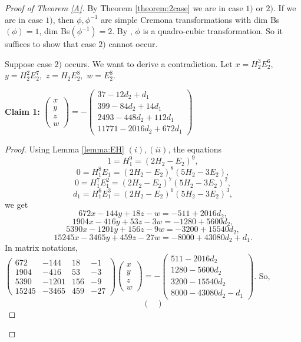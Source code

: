 \documentclass{article}
\begin{document}
\begin{proof}[Proof of Theorem \ref{A}]
By Theorem \ref{theorem:2case} we are in case $1)$ or $2)$. If we are in case $1)$, then $\phi, \phi^{-1}$ are simple Cremona transformations with dim Bs$(\phi)=1$, dim Bs$(\phi^{-1})=2$. By \cite{crauder1989cremona}, $\phi$ is a quadro-cubic transformation. So it suffices to show that case $2)$ cannot occur.

Suppose case $2)$ occurs. We want to derive a contradiction. Let $x=H_2^3E_2^6,$ $ y=H_2^2E_2^7,$ $ z=H_2E_2^8,$ $ w=E_2^8.$

\textbf{Claim 1:} $\begin{pmatrix}
    x \\
    y \\
    z \\
    w
\end{pmatrix}=-\begin{pmatrix}
    37-12d_2+d_1 \\
    399-84d_2+14d_1 \\
    2493-448d_2+112d_1 \\
    11771-2016d_2+672d_1
\end{pmatrix}$
\begin{proof}
    Using Lemma \ref{lemma:EH} $(i), (ii)$, the equations $$1=H_1^9=(2H_2-E_2)^9,$$ $$0=H_1^8E_1=(2H_2-E_2)^8(5H_2-3E_2),$$ $$0=H_1^7E_1^2=(2H_2-E_2)^7(5H_2-3E_2)^2,$$ $$d_1=H_1^6E_1^3=(2H_2-E_2)^6(5H_2-3E_2)^3,$$ we get
    $$672x-144y+18z-w=-511+2016d_2,$$ $$1904x-416y+53z-3w=-1280+5600d_2,$$ $$5390x-1201y+156z-9w=-3200+15540d_2,$$ $$15245x-3465y+459z-27w=-8000+43080d_2+d_1.$$
In matrix notations,
 $\begin{pmatrix}
    672 & -144 & 18 & -1 \\
    1904 & -416 & 53 & -3 \\
    5390 & -1201 & 156 & -9 \\
    15245 & -3465 & 459 & -27
\end{pmatrix}\begin{pmatrix}
    x \\
    y \\
    z \\
    w
\end{pmatrix}=-\begin{pmatrix}
    511-2016d_2 \\
    1280-5600d_2 \\
    3200-15540d_2 \\
    8000-43080d_2-d_1
\end{pmatrix}$. So, $$\begin{pmatrix}

\end{pmatrix}$$
\end{proof}
\end{proof}
\end{document}
